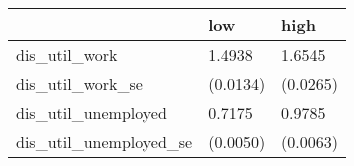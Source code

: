 \begin{tabular}{lll}
\toprule
 & low & high \\
\midrule
dis_util_work & 1.4938 & 1.6545 \\
dis_util_work_se & (0.0134) & (0.0265) \\
dis_util_unemployed & 0.7175 & 0.9785 \\
dis_util_unemployed_se & (0.0050) & (0.0063) \\
\bottomrule
\end{tabular}

